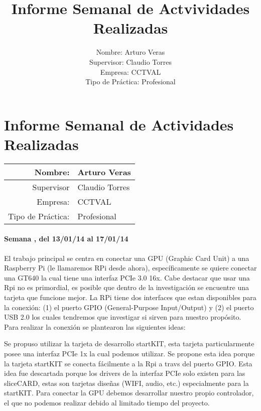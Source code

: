 \documentclass[11pt,oneside,titlepage]{article}
\begin{document}
\title{Informe Semanal de Actvividades Realizadas}
\author{Nombre: Arturo Veras\\ 
	Supervisor: Claudio Torres\\
	Empresa: CCTVAL \\
Tipo de Práctica: Profesional}
%
\section*{Informe Semanal de Actividades Realizadas}
\begin{center}

\begin{tabular}{|r|l|}
\hline 
Nombre:  & Arturo Veras\\ 
\hline 
Supervisor & Claudio Torres \\ 
\hline 
Empresa: & CCTVAL \\ 
\hline 
Tipo de Práctica: & Profesional \\ 
\hline 
\end{tabular} 

\end{center}
\paragraph{Semana , del 13/01/14 al 17/01/14}

El trabajo principal se centra en conectar una GPU (Graphic Card Unit) a una
Raspberry Pi (le llamaremos RPi desde ahora), específicamente se quiere
conectar una GT640 la cual tiene una interfaz PCIe 3.0 16x. Cabe destacar que
usar una Rpi no es primordial, es posible que dentro de la investigación se
encuentre una tarjeta que funcione mejor.  La RPi tiene dos interfaces que
estan disponibles para la conexión: (1) el puerto GPIO (General-Purpose
Input/Output) y (2) el puerto USB 2.0 los cuales tendremos que investigar si
sirven para nuestro propósito.  Para realizar la conexión se plantearon las
siguientes ideas:

Se propuso utilizar la tarjeta de desarrollo startKIT, esta tarjeta
particularmente posee una interfaz PCIe  1x la cual podemos utilizar.  Se
propone esta idea porque la tarjeta startKIT se conecta fácilmente a la Rpi a
travs del puerto GPIO.  Esta idea fue descartada porque los drivers de la
interfaz PCIe solo existen para las sliceCARD, estas son tarjetas diseñas
(WIFI, audio, etc.) especialmente para la startKIT. Para conectar la GPU
debemos desarrollar nuestro propio controlador, el que no podemos realizar
debido al limitado tiempo del proyecto.  
\end{document}
